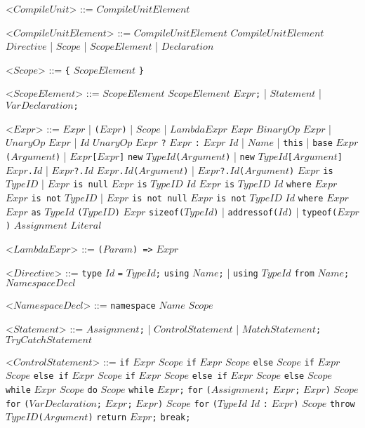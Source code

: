 \documentclass{article}
\newcommand{\gtext}[1]{<$#1$>}
\newcommand{\glit}[1]{\texttt{#1}}
\begin{document}
\begin{grammar}

	\gtext{CompileUnit} ::= $CompileUnitElement$

	\gtext{CompileUnitElement} ::= $CompileUnitElement$ $CompileUnitElement$
	\alt $Directive$ | $Scope$ | $ScopeElement$ | $Declaration$

	\gtext{Scope} ::= \glit{\{} $ScopeElement$ \glit{\}}
	
	\gtext{ScopeElement} ::= $ScopeElement$ $ScopeElement$
	\alt $Expr$\glit{;} | $Statement$	| $VarDeclaration$\glit{;}
	
	\gtext{Expr} ::= $Expr$ | \glit{(}$Expr$\glit{)} | $Scope$ | $LambdaExpr$
	\alt $Expr$ $BinaryOp$ $Expr$ | $UnaryOp$ $Expr$ | $Id$ $UnaryOp$
	\alt $Expr$ \glit{?} $Expr$ \glit{:} $Expr$
	\alt $Id$ | $Name$ | \glit{this} | \glit{base}
	\alt $Expr$\glit{(}$Argument$\glit{)} | $Expr$\glit{[}$Expr$\glit{]}
	\alt \glit{new} $TypeId$\glit{(}$Argument$\glit{)} | \glit{new} $TypeId$\glit{[}$Argument$\glit{]}
	\alt $Expr$\glit{.}$Id$ | $Expr$\glit{?.}$Id$ 
	\alt $Expr$\glit{.}$Id$\glit{(}$Argument$\glit{)} | $Expr$\glit{?.}$Id$\glit{(}$Argument$\glit{)}
	\alt $Expr$ \glit{is} $TypeID$ | $Expr$ \glit{is null} $Expr$ \glit{is} $TypeID$ $Id$
	\alt $Expr$ \glit{is} $TypeID$ $Id$ \glit{where} $Expr$
	\alt $Expr$ \glit{is not} $TypeID$ | $Expr$ \glit{is not null}
	\alt $Expr$ \glit{is not} $TypeID$ $Id$ \glit{where} $Expr$ %
	\alt $Expr$ \glit{as} $TypeId$
	\alt \glit{(}$TypeID$\glit{)} $Expr$
	\alt \glit{sizeof($TypeId$}\glit{)} | \glit{addressof($Id$}\glit{)} | \glit{typeof($Expr$}\glit{)}
	\alt $Assignment$
	\alt $Literal$
	
	\gtext{LambdaExpr} ::= \glit{(}$Param$\glit{) =>} $Expr$
	
	\gtext{Directive} ::= \glit{type} $Id$ \glit{=} $TypeId$\glit{;}
	\alt \glit{using} $Name$\glit{;} | \glit{using} $TypeId$ \glit{from} $Name$\glit{;}
	\alt $NamespaceDecl$

	\gtext{NamespaceDecl} ::= \glit{namespace} $Name$ $Scope$
	
	\gtext{Statement} ::= $Assignment$\glit{;} | $ControlStatement$ | $MatchStatement$\glit{;}
	\alt $TryCatchStatement$
	
	\gtext{ControlStatement} ::= \glit{if} $Expr$ $Scope$
	\alt \glit{if} $Expr$ $Scope$ \glit{else} $Scope$
	\alt \glit{if} $Expr$ $Scope$ \glit{else if} $Expr$ $Scope$
	\alt \glit{if} $Expr$ $Scope$ \glit{else if} $Expr$ $Scope$ \glit{else} $Scope$
	\alt \glit{while} $Expr$ $Scope$
	\alt \glit{do} $Scope$ \glit{while} $Expr$\glit{;}
	\alt \glit{for} \glit{(}$Assignment$\glit{;} $Expr$\glit{;} $Expr$\glit{)} $Scope$
	\alt \glit{for} \glit{(}$VarDeclaration$\glit{;} $Expr$\glit{;} $Expr$\glit{)} $Scope$
	\alt \glit{for} \glit{(}$TypeId$ $Id$ \glit{:} $Expr$\glit{)} $Scope$
	\alt \glit{throw} $TypeID$\glit{(}$Argument$\glit{)}
	\alt \glit{return} $Expr$\glit{;}
	\alt \glit{break;}
	

\end{grammar}
\end{document}
